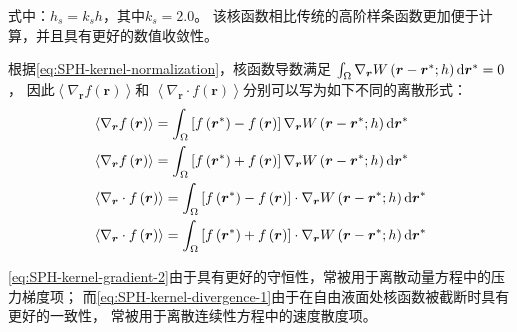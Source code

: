 式中：$h_s = k_s h$，其中$k_s = 2.0$。%
该核函数相比传统的高阶样条函数更加便于计算，并且具有更好的数值收敛性\cite{dehnenImprovingConvergenceSmoothed2012}。

根据\cref{eq:SPH-kernel-normalization}，核函数导数满足%
$\int_{\Omega}{\nabla_{\bm{r}}W\left( \bm{r}-{\bm{r}^{*}};h \right){\rm{d}}{\bm{r}^{*}}} = 0$，%
因此$\left\langle \nabla_{\bm{r}} f\left(\bm{r}\right)\right\rangle$和%
$\left\langle \nabla_{\bm{r}} \cdot f\left(\bm{r}\right)\right\rangle$分别可以写为如下不同的离散形式：
\begin{subequations}
  \begin{align}
    & \left\langle \nabla_{\bm{r}} f\left(\bm{r}\right)\right\rangle = %
    \int_{\Omega} \left[f\left(\bm{r}^{*}\right) - f\left(\bm{r}\right)\right] %
    \nabla_{\bm{r}} W\left(\bm{r} - \bm{r}^{*}; h\right) {\rm{d}} \bm{r}^{*} \label{eq:SPH-kernel-gradient-1}\\
    & \left\langle \nabla_{\bm{r}} f\left(\bm{r}\right)\right\rangle = %
    \int_{\Omega} \left[f\left(\bm{r}^{*}\right) + f\left(\bm{r}\right)\right] %
    \nabla_{\bm{r}} W\left(\bm{r} - \bm{r}^{*}; h\right) {\rm{d}} \bm{r}^{*} \label{eq:SPH-kernel-gradient-2} \\
    & \left\langle \nabla_{\bm{r}} \cdot f\left(\bm{r}\right)\right\rangle = %
    \int_{\Omega} \left[f\left(\bm{r}^{*}\right) - f\left(\bm{r}\right)\right] \cdot %
    \nabla_{\bm{r}} W\left(\bm{r} - \bm{r}^{*}; h\right) {\rm{d}} \bm{r}^{*} \label{eq:SPH-kernel-divergence-1}\\
    & \left\langle \nabla_{\bm{r}} \cdot f\left(\bm{r}\right)\right\rangle = %
    \int_{\Omega} \left[f\left(\bm{r}^{*}\right) + f\left(\bm{r}\right)\right] \cdot %
    \nabla_{\bm{r}} W\left(\bm{r} - \bm{r}^{*}; h\right) {\rm{d}} \bm{r}^{*} \label{eq:SPH-kernel-divergence-2}
  \end{align}
\end{subequations}

\cref{eq:SPH-kernel-gradient-2}由于具有更好的守恒性，常被用于离散动量方程中的压力梯度项；%
而\cref{eq:SPH-kernel-divergence-1}由于在自由液面处核函数被截断时具有更好的一致性，%
常被用于离散连续性方程中的速度散度项\cite{colagrossiTheoreticalConsiderationsFreesurface2009}。

